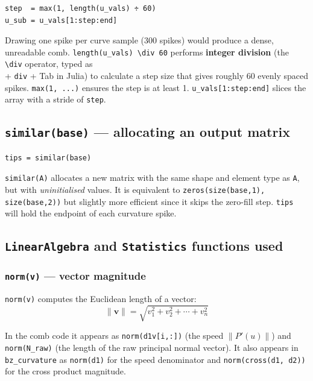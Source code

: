 \documentclass[12pt, a4paper]{article}
\newcommand{\cd}[1]{\texttt{#1}}
\begin{document}
\begin{verbatim}
step  = max(1, length(u_vals) ÷ 60)
u_sub = u_vals[1:step:end]
\end{verbatim}

Drawing one spike per curve sample (300 spikes) would
produce a dense, unreadable comb.
\cd{length(u\_vals) \textbackslash div{} 60} performs \textbf{integer division}
(the \cd{\textbackslash div} operator, typed as \cd{\\} + \cd{div} + Tab in Julia) to
calculate a step size that gives roughly 60 evenly
spaced spikes.
\cd{max(1, ...)} ensures the step is at least 1.
\cd{u\_vals[1:step:end]} slices the array with a stride
of \cd{step}.

\subsection{\texttt{similar(base)} --- allocating an output matrix}

\begin{verbatim}
tips = similar(base)
\end{verbatim}

\cd{similar(A)} allocates a new matrix with the same
shape and element type as \cd{A}, but with
\emph{uninitialised} values.
It is equivalent to \cd{zeros(size(base,1), size(base,2))}
but slightly more efficient since it skips the
zero-fill step.
\cd{tips} will hold the endpoint of each curvature spike.

\subsection{\texttt{LinearAlgebra} and \texttt{Statistics} functions used}

\subsubsection{\texttt{norm(v)} --- vector magnitude}

\cd{norm(v)} computes the Euclidean length of a vector:
\[
  \|\mathbf{v}\| = \sqrt{v_1^2 + v_2^2 + \cdots + v_n^2}
\]

In the comb code it appears as \cd{norm(d1v[i,:])}
(the speed $\|P'(u)\|$) and \cd{norm(N\_raw)}
(the length of the raw principal normal vector).
It also appears in \cd{bz\_curvature} as
\cd{norm(d1)} for the speed denominator and
\cd{norm(cross(d1, d2))} for the cross product magnitude.
\end{document}
